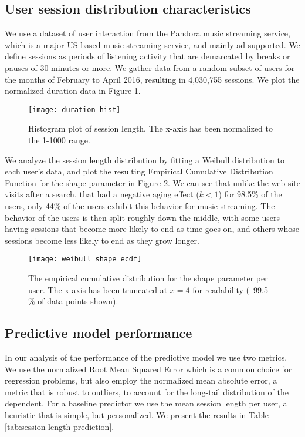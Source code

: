 \subsection{User session distribution characteristics}

We use a dataset of user interaction from the Pandora music streaming service, which
is a major US-based music streaming service, and mainly ad supported. We define
sessions as periods of listening activity that are demarcated by breaks or pauses of
30 minutes or more.
We gather data from a random subset of users for the months of February to April 2016,
resulting in 4,030,755 sessions. We plot the normalized duration data in Figure
\ref{fig:session-length-times}.


\begin{figure}
	\centering
	\texttt{[image: duration-hist]}
	\caption{Histogram plot of session length. The x-axis has been normalized to the 1-1000 range.}
	\label{fig:session-length-times}
\end{figure}

We analyze the session length distribution by fitting a Weibull distribution
to each user's data, and plot the resulting Empirical Cumulative Distribution
Function for the shape parameter in Figure \ref{fig:session-length-shapes}.
We can see that unlike the web site visits after a search, that had a negative aging
effect ($k < 1$) for 98.5\% of the users, only 44\% of the users exhibit
this behavior for music streaming. The behavior of the users is then split
roughly down the middle, with some users having sessions that become more likely
to end as time goes on, and others whose sessions become less likely to end as
they grow longer.


\begin{figure}
	\centering
	\texttt{[image: weibull\_shape\_ecdf]}
	\caption{The empirical cumulative distribution for the shape parameter per user.
		The x axis has been truncated at $x=4$ for readability (~99.5 \% of data points shown).}
	\label{fig:session-length-shapes}
\end{figure}

\subsection{Predictive model performance}

In our analysis of the performance of the predictive model we use two metrics.
We use the normalized Root Mean Squared Error which is a common choice
for regression problems, but also employ the normalized mean absolute error, a metric that is robust to outliers, to account
for the long-tail distribution of the dependent. For a baseline predictor we use the mean
session length per user, a heuristic that is simple, but personalized.
We present the results in Table
\ref{tab:session-length-prediction}.


